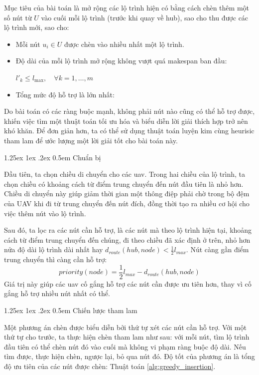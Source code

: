 \documentclass[a4paper]{article}
\makeatletter
\renewcommand{\paragraph}{%
  \@startsection{paragraph}{4}{\z@}%
  {1.25ex \@plus 1ex \@minus .2ex}%
  {0.5em}%
  {\normalfont\normalsize\bfseries}%
}
\makeatother
\begin{document}
Mục tiêu của bài toán là mở rộng các lộ trình hiện có bằng cách chèn thêm một số nút từ $U$ vào cuối mỗi lộ trình (trước khi quay về hub), sao cho thu được các lộ trình mới, sao cho:
\begin{itemize}
  \item Mỗi nút $u_i \in U$ được chèn vào nhiều nhất một lộ trình.
  \item Độ dài của mỗi lộ trình mở rộng không vượt quá makespan ban đầu:

  $l'_k \leq l_{\max}, \quad \forall k = 1, \dots, m$
  \item Tổng mức độ hỗ trợ là lớn nhất:
\end{itemize}

Do bài toán có các ràng buộc mạnh, không phải nút nào cũng có thể hỗ trợ được, khiến việc tìm một thuật toán tối ưu hóa và biểu diễn lời giải thích hợp trở nên khó khăn. Để đơn giản hơn, ta có thể sử dụng thuật toán luyện kim cùng heurisic tham lam để ước lượng một lời giải tốt cho bài toán này.

\paragraph{Chuẩn bị}

Đầu tiên, ta chọn chiều di chuyển cho các uav. Trong hai chiều của lộ trình, ta chọn chiều có khoảng cách từ điểm trung chuyển đến nút đầu tiên là nhỏ hơn. Chiều di chuyển này giúp giảm thời gian một thông điệp phải chờ trong bộ đệm của UAV khi đi từ trung chuyển đến nút đích, đồng thời tạo ra nhiều cơ hội cho việc thêm nút vào lộ trình.

Sau đó, ta lọc ra các nút cần hỗ trợ, là các nút mà theo lộ trình hiện tại, khoảng cách từ điểm trung chuyển đến chúng, đi theo chiều đã xác định ở trên, nhỏ hơn nửa độ dài lộ trình dài nhất hay $d_{route}(hub,node) < \frac 1 2 l_{max}$. Nút càng gần điểm trung chuyển thì càng cần hỗ trợ:
\begin{equation}
priority(node) = \frac 1 2 l_{max} - d_{route}(hub,node)
\end{equation}
Giá trị này giúp các uav cố gắng hỗ trợ các nút cần được ưu tiên hơn, thay vì cố gắng hỗ trợ nhiều nút nhất có thể.

\paragraph{Chiến lược tham lam}

Một phương án chèn được biểu diễn bởi thứ tự xét các nút cần hỗ trợ. Với một thứ tự cho trước, ta thực hiện chèn tham lam như sau: với mỗi nút, tìm lộ trình đầu tiên có thể chèn nút đó vào cuối mà không vi phạm ràng buộc độ dài. Nếu tìm được, thực hiện chèn, ngược lại, bỏ qua nút đó. Độ tốt của phương án là tổng độ ưu tiên của các nút được chèn: Thuật toán \ref{alg:greedy_insertion}.
\end{document}

